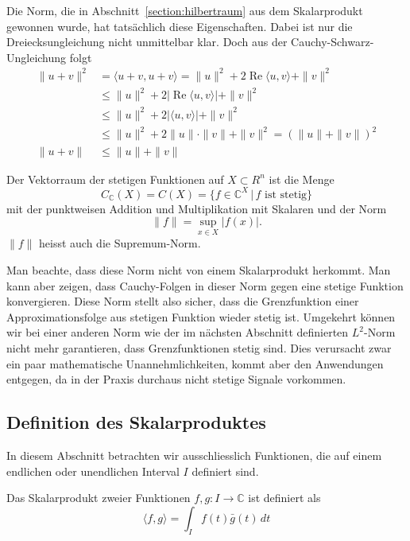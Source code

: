 Die Norm, die in Abschnitt~\ref{section:hilbertraum} aus dem Skalarprodukt
gewonnen wurde, hat tatsächlich diese Eigenschaften.
Dabei ist nur die Dreiecksungleichung nicht unmittelbar klar.
Doch aus der Cauchy-Schwarz-Ungleichung folgt
\begin{align*}
\| u + v \|^2
&=
\langle u+v,u+v\rangle
=
\| u \|^2 + 2\operatorname{Re} \langle u,v\rangle + \| v\|^2
\\
&\le
\| u \|^2 + 2|\operatorname{Re} \langle u,v\rangle| + \| v\|^2
\\
&\le
\| u \|^2 + 2|\langle u,v\rangle| + \| v\|^2
\\
&\le
\| u \|^2 + 2\| u \| \cdot \|v\| + \| v\|^2
=
(\|u\| + \| v \|)^2
\\
\|u+v\|
&\le
\|u\| + \|v\|
\end{align*}

\begin{definition}
Der Vektorraum der stetigen Funktionen auf $X\subset R^n$ ist die Menge
\[
C_{\mathbb C}(X)
=
C(X)
=
\{ f\in \mathbb C^X\,|\, \text{$f$ ist stetig}\}
\]
mit der punktweisen Addition und Multiplikation mit Skalaren und der
Norm
\[
\| f \| = \sup_{x\in X} |f(x)|.
\]
$\|f\|$ heisst auch die Supremum-Norm.
\end{definition}

Man beachte, dass diese Norm nicht von einem Skalarprodukt herkommt.
Man kann aber zeigen, dass Cauchy-Folgen in dieser Norm gegen eine
stetige Funktion konvergieren.
Diese Norm stellt also sicher, dass die Grenzfunktion einer
Approximationsfolge aus stetigen Funktion wieder stetig ist.
Umgekehrt können wir bei einer anderen Norm wie der im nächsten
Abschnitt definierten $L^2$-Norm nicht mehr garantieren, dass 
Grenzfunktionen stetig sind.
Dies verursacht zwar ein paar mathematische Unannehmlichkeiten,
kommt aber den Anwendungen entgegen, da in der Praxis durchaus
nicht stetige Signale vorkommen.

\subsection{Definition des Skalarproduktes}
In diesem Abschnitt betrachten wir ausschliesslich Funktionen, die auf
einem endlichen oder unendlichen Interval $I$ definiert sind.

\begin{definition}
Das Skalarprodukt zweier Funktionen $f,g\colon I\to\mathbb C$ ist definiert
als
\[
\langle f,g\rangle
=
\int_I f(t) \bar{g}(t)\,dt
\]
\end{definition}

